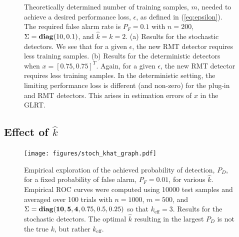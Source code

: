 \begin{figure}
\centering
{}
\vspace{-0.1in}
\caption{Theoretically determined number of training samples, $m$, needed to achieve a desired performance loss, $\epsilon$, as defined in (\ref{eq:epsilon}). The required false alarm rate is $P_F=0.1$ with $n=200$, $\Sigma = \mathop{\bf diag}(10,0.1)$, and $\widehat{k}=k=2$. (a) Results for the stochastic detectors. We see that for a given $\epsilon$, the new RMT detector requires less training samples. (b) Results for the deterministic detectors when $x=[0.75,0.75]^T$. Again, for a given $\epsilon$, the new RMT detector requires less training samples. In the deterministic setting, the limiting performance loss is different (and non-zero) for the plug-in and RMT detectors. This arises in estimation errors of $x$ in the GLRT.}
\label{fig:epsilon_combined}
\end{figure}

\subsection{Effect of $\widehat{k}$}
\begin{figure}
\centering
\texttt{[image: figures/stoch\_khat\_graph.pdf]}
\label{fig:stoch_khat}
\vspace{-0.1in}
\caption{Empirical exploration of the achieved probability of detection, $P_D$, for a
  fixed probability of false alarm, $P_F=0.01$, for various $\widehat{k}$. Empirical ROC
  curves were computed using 10000 test samples and averaged over 100 trials with
  $n=1000$, $m=500$, and $\Sigma = \mathop{\bf diag}({\bf{10,5,4}},0.75,0.5,0.25)$ so that
  $k_{\text{eff}}=3$. Results for the stochastic detectors. The optimal $\widehat{k}$ resulting in the largest $P_D$ is not the true $k$, but rather $k_\text{eff}$.} %
\label{fig:khat_graphs}
\vspace{-0.3in}
\end{figure}

